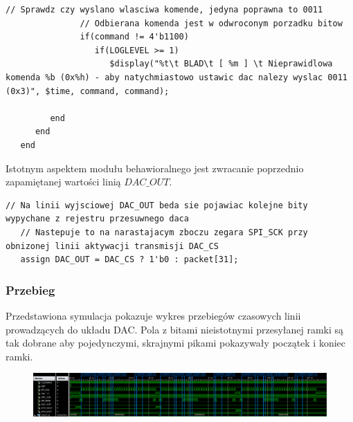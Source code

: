 \documentclass[a4paper,12pt]{article}
\begin{document}
\begin{lstlisting}[label=DacLTC2624Behav,caption=DacLTC2624Behav.v,firstnumber=197]
               // Sprawdz czy wyslano wlasciwa komende, jedyna poprawna to 0011
               // Odbierana komenda jest w odwroconym porzadku bitow
               if(command != 4'b1100)
                  if(LOGLEVEL >= 1)
                     $display("%t\t BLAD\t [ %m ] \t Nieprawidlowa komenda %b (0x%h) - aby natychmiastowo ustawic dac nalezy wyslac 0011 (0x3)", $time, command, command);

         end
      end
   end
\end{lstlisting}

Istotnym aspektem modułu behawioralnego jest zwracanie poprzednio zapamiętanej wartości linią $DAC\_OUT$.
\begin{lstlisting}[label=DacLTC2624Behav,caption=DacLTC2624Behav.v,firstnumber=255]
   // Na linii wyjsciowej DAC_OUT beda sie pojawiac kolejne bity wypychane z rejestru przesuwnego daca
   // Nastepuje to na narastajacym zboczu zegara SPI_SCK przy obnizonej linii aktywacji transmisji DAC_CS
   assign DAC_OUT = DAC_CS ? 1'b0 : packet[31];
\end{lstlisting}

\subsubsection{Przebieg}

Przedstawiona symulacja pokazuje wykres przebiegów czasowych linii prowadzących do układu DAC. Pola z bitami nieistotnymi przesyłanej ramki są tak dobrane aby pojedynczymi, skrajnymi pikami pokazywały początek i koniec ramki.

\begin{figure}[htb]
   \centering
   \includegraphics[width=15cm]{grafika/dac_sim.png}
\end{figure}
\end{document}
